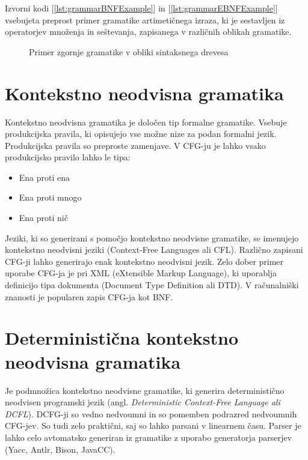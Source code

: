 \documentclass[a4paper, 12pt, tikz, border=5]{book}
\begin{document}
Izvorni kodi [\ref{lst:grammarBNFExample}] in [\ref{lst:grammarEBNFExample}] vsebujeta preprost primer gramatike artimetičnega izraza, ki je sestavljen iz operatorjev množenja in seštevanja, zapisanega v različnih oblikah gramatike.

\begin{figure}[h!]
\centering
{}
\caption{Primer zgornje gramatike v obliki sintaksnega drevesa}
\label{grammarExampleSyntaxTree}
\end{figure}


\section{Kontekstno neodvisna gramatika} %
Kontekstno neodvisna gramatika je določen tip formalne gramatike. Vsebuje produkcijska pravila, ki opisujejo vse možne nize za podan formalni jezik. Produkcijska pravila so preproste zamenjave. V CFG-ju je lahko vsako produkcijsko pravilo lahko le tipa:
\begin{itemize}
\item Ena proti ena 
\item Ena proti mnogo
\item Ena proti nič
\end{itemize}

Jeziki, ki so generirani s pomočjo kontekstno neodvisne gramatike, se imenujejo kontekstno neodvisni jeziki (Context-Free Languages ali CFL). Različno zapisani CFG-ji lahko generirajo enak kontekstno neodvisni jezik. Zelo dober primer uporabe CFG-ja je pri XML (eXtensible Markup Language), ki uporablja definicijo tipa dokumenta (Document Type Definition ali DTD). V računalniški znanosti je popularen zapis CFG-ja kot BNF.

\section{Deterministična kontekstno neodvisna gramatika} %
Je podmnožica kontekstno neodvisne gramatike, ki generira deterministično neodvisen programski jezik (angl. \textit{Deterministic Context-Free Language ali DCFL}). DCFG-ji so vedno nedvoumni in so pomemben podrazred nedvoumnih CFG-jev. So tudi zelo praktični, saj so lahko parsani v linearnem času. Parser je lahko celo avtomatsko generiran iz gramatike z uporabo generatorja parserjev (Yacc, Antlr, Bison, JavaCC).
\end{document}
